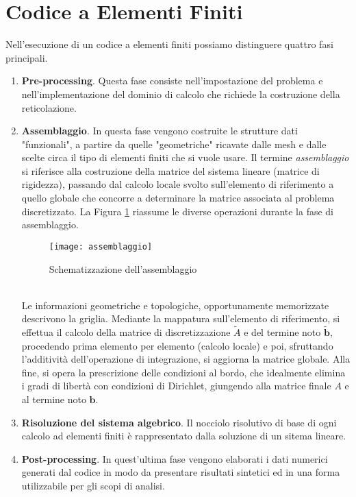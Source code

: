 \documentclass[10pt]{amsart}
\begin{document}
\section{Codice a Elementi Finiti}
Nell'esecuzione di un codice a elementi finiti possiamo distinguere 
quattro fasi principali.
\begin{enumerate}
\item {\bf Pre-processing}. Questa fase consiste nell'impostazione del 
problema e nell'implementazione del dominio di calcolo che richiede la 
costruzione della reticolazione.
\item {\bf Assemblaggio}. In questa fase vengono costruite le strutture 
dati "funzionali", a partire da quelle "geometriche" ricavate dalle 
mesh e dalle scelte circa il tipo di elementi finiti che si vuole 
usare. Il termine {\it assemblaggio} si riferisce alla costruzione 
della matrice del sistema lineare (matrice di rigidezza), passando dal 
calcolo locale svolto sull'elemento di riferimento a quello globale 
che concorre a determinare la matrice associata al problema 
discretizzato. La Figura \ref{assembl} riassume le diverse operazioni 
durante la fase di assemblaggio.
\begin{figure}[h]
 	\centering
	\texttt{[image: assemblaggio]}
	\caption{Schematizzazione dell'assemblaggio}
	\label{assembl}
\end{figure}\\
Le informazioni geometriche e topologiche, opportunamente memorizzate 
descrivono la griglia. Mediante la mappatura sull'elemento di 
riferimento, si effettua il calcolo della matrice di discretizzazione 
$\tilde{A}$ e del termine noto $\tilde{\mathbf{b}}$, procedendo prima 
elemento per elemento (calcolo locale) e poi, sfruttando 
l'additivit\`a dell'operazione di integrazione, si aggiorna la matrice 
globale. Alla fine, si opera la prescrizione delle condizioni al 
bordo, che idealmente elimina i gradi di libert\`a con condizioni di 
Dirichlet, giungendo alla matrice finale $A$ e al termine noto 
$\mathbf{b}$.  
\item {\bf Risoluzione del sistema algebrico}. Il nocciolo risolutivo di 
base di ogni calcolo ad elementi finiti \`e rappresentato dalla 
soluzione di un sitema lineare.
\item {\bf Post-processing}. In quest'ultima fase vengono elaborati i 
dati numerici generati dal codice in modo da presentare risultati 
sintetici ed in una forma utilizzabile per gli scopi di analisi.  
\end{enumerate}
\end{document}
